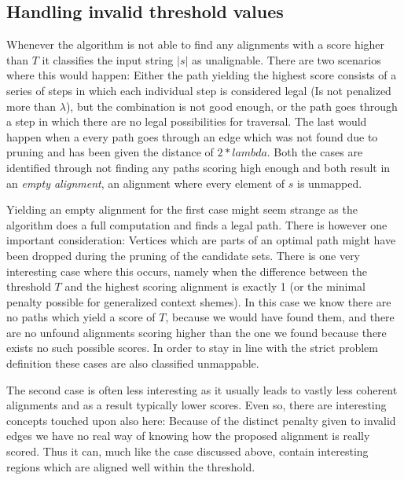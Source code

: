 \documentclass[thesis.tex]{subfiles}
\begin{document}
\subsection{Handling invalid threshold values}
Whenever the algorithm is not able to find any alignments with a score higher than $T$ it classifies the input string $|s|$ as unalignable. There are two scenarios where this would happen: Either the path yielding the highest score consists of a series of steps in which each individual step is considered legal (Is not penalized more than $\lambda$), but the combination is not good enough, or the path goes through a step in which there are no legal possibilities for traversal. The last would happen when a every path goes through an edge which was not found due to pruning and has been given the distance of $2*lambda$. Both the cases are identified through not finding any paths scoring high enough and both result in an \textit{empty alignment}, an alignment where every element of $s$ is unmapped. \\
\par\noindent
Yielding an empty alignment for the first case might seem strange as the algorithm does a full computation and finds a legal path. There is however one important consideration: Vertices which are parts of an optimal path might have been dropped during the pruning of the candidate sets. There is one very interesting case where this occurs, namely when the difference between the threshold $T$ and the highest scoring alignment is exactly 1 (or the minimal penalty possible for generalized context shemes). In this case we know there are no paths which yield a score of $T$, because we would have found them, and there are no unfound alignments scoring higher than the one we found because there exists no such possible scores. In order to stay in line with the strict problem definition these cases are also classified unmappable.\\
\par\noindent
The second case is often less interesting as it usually leads to vastly less coherent alignments and as a result typically lower scores. Even so, there are interesting concepts touched upon also here: Because of the distinct penalty given to invalid edges we have no real way of knowing how the proposed alignment is really scored. Thus it can, much like the case discussed above, contain interesting regions which are aligned well within the threshold.
\end{document}
